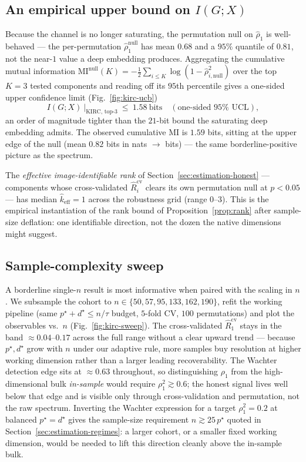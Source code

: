 \documentclass{article}
\begin{document}
\subsection{An empirical upper bound on $I(G;X)$}
\label{sec:kirc-ucb}
Because the channel is no longer saturating, the permutation null on
$\hat\rho_1$ is well-behaved --- the per-permutation $\hat\rho_1^{\mathrm{null}}$
has mean $0.68$ and a $95\%$ quantile of $0.81$, not the near-$1$ value a deep
embedding produces. Aggregating the cumulative mutual information
$\mathrm{MI}^{\mathrm{null}}(K) = -\tfrac12 \sum_{i\le K}
\log(1 - \hat\rho_{i,\mathrm{null}}^2)$ over the top $K=3$ tested components and
reading off its $95$th percentile gives a one-sided upper confidence limit
(Fig.~\ref{fig:kirc-ucb})
\begin{equation}
I(G;X)\ \big|_{\text{KIRC, top-}3}\ \le\ 1.58\ \mathrm{bits}\quad
(\text{one-sided }95\%\text{ UCL}),
\label{eq:kirc-ucl}
\end{equation}
an order of magnitude tighter than the $21$-bit bound the saturating deep
embedding admits. The observed cumulative MI is $1.59$ bits, sitting at the
upper edge of the null (mean $0.82$ bits in nats $\to$ bits) --- the same
borderline-positive picture as the spectrum.

The \emph{effective image-identifiable rank} of
Section~\ref{sec:estimation-honest} --- components whose cross-validated
$\hat R_i^{\mathrm{cv}}$ clears its own permutation null at $p<0.05$ --- has
median $\hat k_{\mathrm{eff}} = 1$ across the robustness grid (range $0$--$3$).
This is the empirical instantiation of the rank bound of
Proposition~\ref{prop:rank} after sample-size deflation: one identifiable
direction, not the dozen the native dimensions might suggest.

\subsection{Sample-complexity sweep}
\label{sec:kirc-sweep}
A borderline single-$n$ result is most informative when paired with the
scaling in $n$. We subsample the cohort to
$n \in \{50, 57, 95, 133, 162, 190\}$, refit the working pipeline (same
$p^\star + d^\star \le n/\tau$ budget, $5$-fold CV, $100$ permutations) and
plot the observables vs.\ $n$ (Fig.~\ref{fig:kirc-sweep}). The
cross-validated $\hat R_1^{\mathrm{cv}}$ stays in the band
$\approx 0.04$--$0.17$ across the full range without a clear upward trend ---
because $p^\star, d^\star$ grow with $n$ under our adaptive rule, more samples
buy resolution at higher working dimension rather than a larger leading
recoverability. The Wachter detection edge sits at $\approx 0.63$ throughout,
so distinguishing $\rho_1$ from the high-dimensional bulk \emph{in-sample}
would require $\rho_1^2 \gtrsim 0.6$; the honest signal lives well below that
edge and is visible only through cross-validation and permutation, not the raw
spectrum. Inverting the Wachter expression for a target $\rho_1^2 = 0.2$ at
balanced $p^\star = d^\star$ gives the sample-size requirement
$n \gtrsim 25\,p^\star$ quoted in Section~\ref{sec:estimation-regimes}: a
larger cohort, or a smaller fixed working dimension, would be needed to lift
this direction cleanly above the in-sample bulk.
\end{document}
